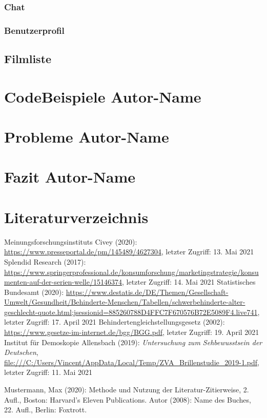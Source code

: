 \documentclass[11pt,a4paper]{article}
\begin{document}
\subsubsection{Chat}
\label{sec:UI-Chat}



\subsubsection{Benutzerprofil}
\label{sec:benutzerprofil}



\subsection{Filmliste}


\section[CodeBeispiele]{CodeBeispiele \hfill \normalfont \small{Autor-Name}}


\section[Probleme]{Probleme \hfill \normalfont \small{Autor-Name}}


\section[Fazit]{Fazit \hfill \normalfont \small{Autor-Name}}


\section{Literaturverzeichnis}
\begin{itemize}
 Meinungsforschungsinstituts Civey (2020):  \url{https://www.presseportal.de/pm/145489/4627304}, letzter Zugriff: 13. Mai 2021
 Splendid Research (2017): \url{https://www.springerprofessional.de/konsumforschung/marketingstrategie/konsumenten-auf-der-serien-welle/15146374}, letzter Zugriff: 14. Mai 2021
 Statistisches Bundesamt (2020): \url{https://www.destatis.de/DE/Themen/Gesellschaft-Umwelt/Gesundheit/Behinderte-Menschen/Tabellen/schwerbehinderte-alter-geschlecht-quote.html;jsessionid=885260788D4FFC7F670576B72E5089F4.live741}, letzter Zugriff: 17. April 2021
 Behindertengleichstellungsgesetz (2002): \url{https://www.gesetze-im-internet.de/bgg/BGG.pdf}, letzter Zugriff: 19. April 2021
 Institut für Demoskopie Allensbach (2019): \textit{Untersuchung zum Sehbewusstsein der Deutschen},  \url{file:///C:/Users/Vincent/AppData/Local/Temp/ZVA_Brillenstudie_2019-1.pdf}, letzter Zugriff: 11. Mai 2021


 Mustermann, Max (2020): Methode und Nutzung der Literatur-Zitierweise, 2. Aufl., Boston: Harvard’s Eleven Publications.
 Autor (2008): Name des Buches, 22. Aufl., Berlin: Foxtrott.
\end{itemize}
\end{document}
